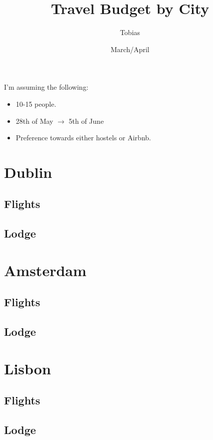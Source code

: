 \documentclass[12pt]{article}
\title{Travel Budget by City}
\author{Tobias}
\date{March/April}
\begin{document}
	\maketitle
	I'm assuming the following:
	\begin{itemize}
		\item 10-15 people.
		\item 28th of May $\rightarrow$ 5th of June
		\item Preference towards either hostels or Airbnb.
	\end{itemize}
	
	\section{Dublin}
	\subsection{Flights}
	
	\subsection{Lodge}
	
	\section{Amsterdam}
	
	\subsection{Flights}
	
	\subsection{Lodge}
	
	\section{Lisbon}
	
	\subsection{Flights}
	
	\subsection{Lodge}
\end{document}
